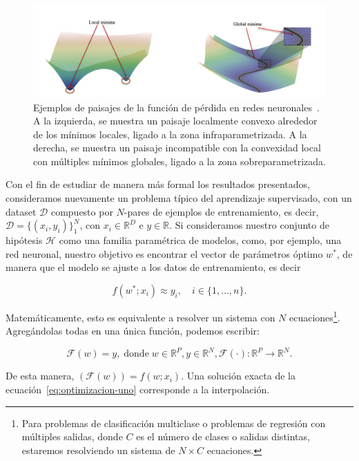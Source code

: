 \begin{figure}[h]
    \centering
    \includegraphics[width=0.8\linewidth]{img/localglobalminima.png}
    \caption[Ejemplos de paisajes de la función de pérdida en redes neuronales~\cite{Liu2021}.]{Ejemplos de paisajes de la función de pérdida en redes neuronales~\cite{Liu2021}. A la izquierda, se muestra un paisaje localmente convexo alrededor de los mínimos locales, ligado a la zona infraparametrizada. A la derecha, se muestra un paisaje incompatible con la convexidad local con múltiples mínimos globales, ligado a la zona sobreparametrizada.}\label{fig:localglobalminima}
\end{figure}

Con el fin de estudiar de manera más formal los resultados presentados, consideramos nuevamente un problema típico del aprendizaje supervisado, con un dataset $\mathcal{D}$ compuesto por $N$-pares de ejemplos de entrenamiento, es decir,  $\mathcal{D} = \{(x_i, y_i)\}_{1}^{N}$, con $x_i \in \mathbb{R}^{D}$ e $y \in \mathbb{R}$. Si consideramos nuestro conjunto de hipótesis $\mathcal{H}$ como una familia paramétrica de modelos, como, por ejemplo, una red neuronal, nuestro objetivo es encontrar el vector de parámetros óptimo $w^{*}$, de manera que el modelo se ajuste a los datos de entrenamiento, es decir

\[
    f(w^{*}; x_i) \approx y_i, \quad i \in \{1,\ldots,n \}.
\]

Matemáticamente, esto es equivalente a resolver un sistema con $N$ ecuaciones\footnote{Para problemas de clasificación multiclase o problemas de regresión con múltiples salidas, donde $C$ es el número de clases o salidas distintas, estaremos resolviendo un sistema de $N \times C$ ecuaciones.}. Agregándolas todas en una única función, podemos escribir:

\begin{equation}\label{eq:optimizacion-uno}
    \mathcal{F}(w) = y, \; \text{donde} \; w \in \mathbb{R}^{P}, y \in \mathbb{R}^{N}, \mathcal{F}(\cdot):\mathbb{R}^{P} \to \mathbb{R}^{N}.
\end{equation}

De esta manera, $(\mathcal{F}(w)) = f(w; x_i)$. Una solución exacta de la ecuación~\eqref{eq:optimizacion-uno} corresponde a la interpolación.

